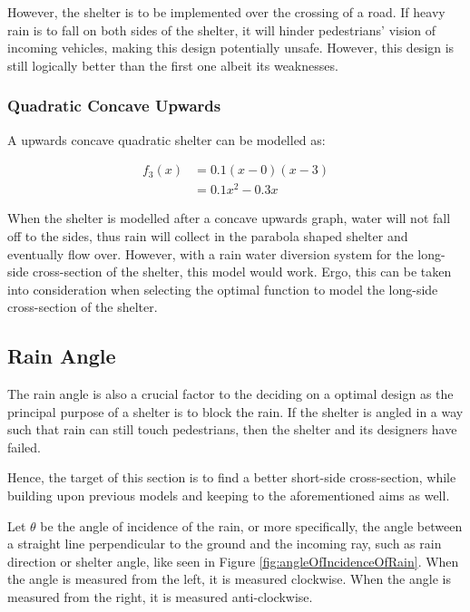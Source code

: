 \documentclass[a4paper,titlepage]{article}
\begin{document}
However, the shelter is to be implemented over the crossing of a road. If heavy rain is to fall on both sides of the shelter, it will hinder pedestrians' vision of incoming vehicles, making this design potentially unsafe. However, this design is still logically better than the first one albeit its weaknesses.

\subsubsection{Quadratic Concave Upwards}
A upwards concave quadratic shelter can be modelled as:

\begin{align}
    f_3(x)&=0.1(x-0)(x-3)\\&=0.1x^2-0.3x
\end{align}


When the shelter is modelled after a concave upwards graph, water will not fall off to the sides, thus rain will collect in the parabola shaped shelter and eventually flow over. However, with a rain water diversion system for the long-side cross-section of the shelter, this model would work. Ergo, this can be taken into consideration when selecting the optimal function to model the long-side cross-section of the shelter.

\subsection{Rain Angle}\label{sec:Mathematical Model:Rain Angle}

The rain angle is also a crucial factor to the deciding on a optimal design as the principal purpose of a shelter is to block the rain. If the shelter is angled in a way such that rain can still touch pedestrians, then the shelter and its designers have failed.

Hence, the target of this section is to find a better short-side cross-section, while building upon previous models and keeping to the aforementioned aims as well.

Let $\theta$ be the angle of incidence of the rain, or more specifically, the angle between a straight line perpendicular to the ground and the incoming ray, such as rain direction or shelter angle, like seen in Figure \ref{fig:angleOfIncidenceOfRain}. When the angle is measured from the left, it is measured clockwise. When the angle is measured from the right, it is measured anti-clockwise.
\end{document}
